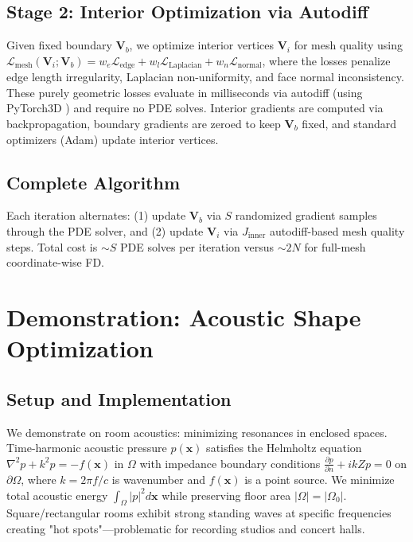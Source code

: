 \documentclass{article}
\begin{document}
\subsection{Stage 2: Interior Optimization via Autodiff}

Given fixed boundary $\mathbf{V}_b$, we optimize interior vertices $\mathbf{V}_i$ for mesh quality using $\mathcal{L}_{\text{mesh}}(\mathbf{V}_i; \mathbf{V}_b) = w_e \mathcal{L}_{\text{edge}} + w_l \mathcal{L}_{\text{Laplacian}} + w_n \mathcal{L}_{\text{normal}}$, where the losses penalize edge length irregularity, Laplacian non-uniformity, and face normal inconsistency. These purely geometric losses evaluate in milliseconds via autodiff (using PyTorch3D \cite{ravi2020pytorch3d}) and require no PDE solves. Interior gradients are computed via backpropagation, boundary gradients are zeroed to keep $\mathbf{V}_b$ fixed, and standard optimizers (Adam) update interior vertices.

\subsection{Complete Algorithm}

Each iteration alternates: (1) update $\mathbf{V}_b$ via $S$ randomized gradient samples through the PDE solver, and (2) update $\mathbf{V}_i$ via $J_{\text{inner}}$ autodiff-based mesh quality steps. Total cost is $\sim S$ PDE solves per iteration versus $\sim 2N$ for full-mesh coordinate-wise FD.

\section{Demonstration: Acoustic Shape Optimization}

\subsection{Setup and Implementation}

We demonstrate on room acoustics: minimizing resonances in enclosed spaces. Time-harmonic acoustic pressure $p(\mathbf{x})$ satisfies the Helmholtz equation $\nabla^2 p + k^2 p = -f(\mathbf{x})$ in $\Omega$ with impedance boundary conditions $\frac{\partial p}{\partial n} + ikZp = 0$ on $\partial\Omega$, where $k = 2\pi f/c$ is wavenumber and $f(\mathbf{x})$ is a point source. We minimize total acoustic energy $\int_{\Omega} |p|^2 d\mathbf{x}$ while preserving floor area $|\Omega| = |\Omega_0|$. Square/rectangular rooms exhibit strong standing waves at specific frequencies creating "hot spots"—problematic for recording studios and concert halls.
\end{document}
